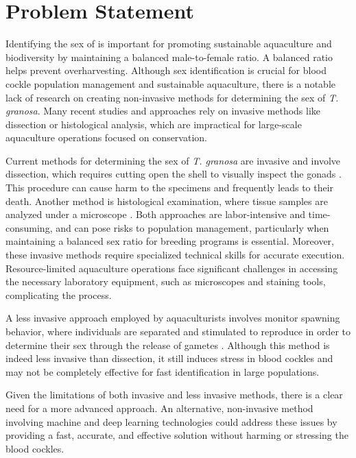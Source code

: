 \section{Problem Statement}

Identifying the sex of \Tegillarcagranosa is important for promoting sustainable aquaculture and biodiversity by maintaining a balanced male-to-female ratio. A balanced ratio helps prevent overharvesting. Although sex identification is crucial for blood cockle population management and sustainable aquaculture, there is a notable lack of research on creating non-invasive methods for determining the sex of \textit{T. granosa}. Many recent studies and approaches rely on invasive methods like dissection or histological analysis, which are impractical for large-scale aquaculture operations focused on conservation.

Current methods for determining the sex of \textit{T. granosa} are invasive and  involve dissection, which requires cutting open the shell to visually inspect the gonads \cite{erica2018}. This procedure can cause harm to the specimens and frequently leads to their death. Another method is histological examination, where tissue samples are analyzed under a microscope \cite{may2021}. Both approaches are labor-intensive and time-consuming, and can pose risks to population management, particularly when maintaining a balanced sex ratio for breeding programs is essential. Moreover, these invasive methods require specialized technical skills for accurate execution. Resource-limited aquaculture operations face significant challenges in accessing the necessary laboratory equipment, such as microscopes and staining tools, complicating the process.

A less invasive approach employed by aquaculturists involves monitor spawning behavior, where individuals are separated and stimulated to reproduce in order to determine their sex through the release of gametes \cite{miranda2023}. Although this method is indeed less invasive than dissection, it still induces stress in blood cockles and may not be completely effective for fast identification in large populations.

Given the limitations of both invasive and less invasive methods, there is a clear need for a more advanced approach. An alternative, non-invasive method involving machine and deep learning technologies could address these issues by providing a fast, accurate, and effective solution without harming or stressing the blood cockles.

